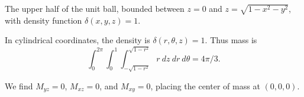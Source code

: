 {
The upper half of the unit ball, bounded between $z= 0$ and $z=\sqrt{1-x^2-y^2}$, with density function $\delta(x,y,z) =1$.
\label{ex:13_07_ex_26} 
}
{In cylindrical coordinates, the density is $\delta(r,\theta,z) = 1$. Thus mass is
$$\int_0^{2\pi}\int_0^1\int_{-\sqrt{1-r^2}}^{\sqrt{1-r^2}} r\ dz\ dr\ d\theta = 4\pi/3.$$

We find $M_{yz} = 0$, $M_{xz} = 0$, and $M_{xy} = 0$, placing the center of mass at $(0,0,0)$.
}
